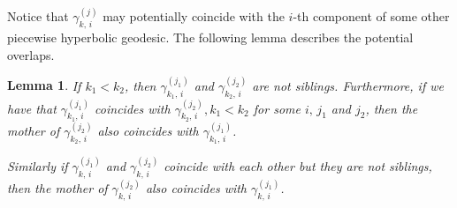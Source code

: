 \documentclass[reqno,11pt]{amsart}
\makeatletter
\newtheorem{lem}[thm]{Lemma}%
\numberwithin{equation}{section}
\theoremstyle{remark}
\makeatother
\begin{document}
Notice that $\gamma_{k,\,i}^{(j)}$ may potentially  coincide with the 
$i$-th component of some other piecewise hyperbolic geodesic. 
The following lemma  describes the potential overlaps. 
\begin{lem}\label{continuous chain}
If $k_1<k_2$, then  $\gamma_{k_1,\,i}^{(j_1)}$ and $\gamma_{k_2,\,i}^{(j_2)}$ are not siblings. Furthermore, if we have that $\gamma_{k_1,\,i}^{(j_1)}$ coincides with $\gamma_{k_2,\,i}^{(j_2)}, k_1<k_2$ for some $i,\,j_1$ and $j_2$, then the mother of $\gamma_{k_2,\,i}^{(j_2)}$ also coincides with $\gamma_{k_1,\,i}^{(j_1)}$. 

Similarly if $\gamma_{k,\,i}^{(j_1)}$ and $\gamma_{k,\,i}^{(j_2)}$ coincide with each other but they are not siblings, then the mother of $\gamma_{k,\,i}^{(j_2)}$ also coincides with $\gamma_{k,\,i}^{(j_1)}$. 
\end{lem}
\end{document}
